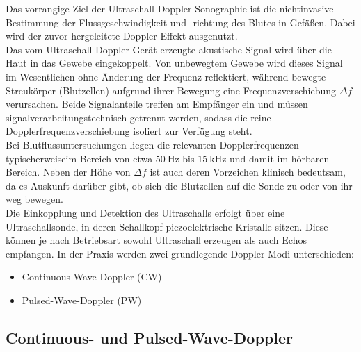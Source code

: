 \documentclass[
	german,%
	accentcolor=3d,%
	type=intern, %
	marginpar=false,%
]{tudapub}
\begin{document}
   Das vorrangige Ziel der Ultraschall-Doppler-Sonographie ist die nichtinvasive Bestimmung der Flussgeschwindigkeit und -richtung des Blutes in Gefäßen. Dabei wird der zuvor hergeleitete Doppler-Effekt ausgenutzt.
   \\
   Das vom Ultraschall-Doppler-Gerät erzeugte akustische Signal wird über die Haut in das Gewebe eingekoppelt. Von unbewegtem Gewebe wird dieses Signal im Wesentlichen ohne Änderung der Frequenz reflektiert, während bewegte Streukörper (Blutzellen) aufgrund ihrer Bewegung eine Frequenzverschiebung \(\Delta f\) verursachen. Beide Signalanteile treffen am Empfänger ein und müssen signalverarbeitungstechnisch getrennt werden, sodass die reine Dopplerfrequenzverschiebung isoliert zur Verfügung steht.
   \\
   Bei Blutflussuntersuchungen liegen die relevanten Dopplerfrequenzen typischerweiseim Bereich von etwa \(50~\mathrm{Hz}\) bis \(15~\mathrm{kHz}\) und damit im hörbaren Bereich. Neben der Höhe von \(\Delta f\) ist auch deren Vorzeichen klinisch bedeutsam, da es Auskunft darüber gibt, ob sich die Blutzellen auf die Sonde zu oder von ihr weg bewegen.
   \\
   Die Einkopplung und Detektion des Ultraschalls erfolgt über eine Ultraschallsonde, in deren Schallkopf piezoelektrische Kristalle sitzen. Diese können je nach Betriebsart sowohl Ultraschall erzeugen als auch Echos empfangen. In der Praxis werden zwei grundlegende Doppler-Modi unterschieden:
   \begin{itemize}
      \item Continuous-Wave-Doppler (CW)
      \item Pulsed-Wave-Doppler (PW)
   \end{itemize}

      \subsection{Continuous- und Pulsed-Wave-Doppler}\label{subsec:cw-pw}
\end{document}
